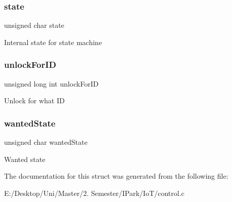 \subsubsection{\texorpdfstring{state}{state}}
{\footnotesize\ttfamily unsigned char state}

Internal state for state machine \mbox{\label{struct_c_o_n_t_r_o_l__t_a56fc156d2b30953b714e34a76a049912}} 
\subsubsection{\texorpdfstring{unlock\+For\+ID}{unlockForID}}
{\footnotesize\ttfamily unsigned long int unlock\+For\+ID}

Unlock for what ID \mbox{\label{struct_c_o_n_t_r_o_l__t_aeb475cff437db460df4f0a7fda472aac}} 
\subsubsection{\texorpdfstring{wanted\+State}{wantedState}}
{\footnotesize\ttfamily unsigned char wanted\+State}

Wanted state 

The documentation for this struct was generated from the following file\+:\begin{DoxyCompactItemize}
\item 
E\+:/\+Desktop/\+Uni/\+Master/2. Semester/\+I\+Park/\+Io\+T/control.\+c\end{DoxyCompactItemize}
